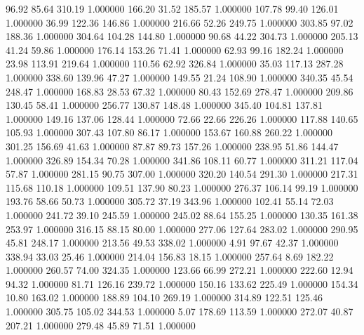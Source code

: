      96.92     85.64    310.19  1.000000
    166.20     31.52    185.57  1.000000
    107.78     99.40    126.01  1.000000
     36.99    122.36    146.86  1.000000
    216.66     52.26    249.75  1.000000
    303.85     97.02    188.36  1.000000
    304.64    104.28    144.80  1.000000
     90.68     44.22    304.73  1.000000
    205.13     41.24     59.86  1.000000
    176.14    153.26     71.41  1.000000
     62.93     99.16    182.24  1.000000
     23.98    113.91    219.64  1.000000
    110.56     62.92    326.84  1.000000
     35.03    117.13    287.28  1.000000
    338.60    139.96     47.27  1.000000
    149.55     21.24    108.90  1.000000
    340.35     45.54    248.47  1.000000
    168.83     28.53     67.32  1.000000
     80.43    152.69    278.47  1.000000
    209.86    130.45     58.41  1.000000
    256.77    130.87    148.48  1.000000
    345.40    104.81    137.81  1.000000
    149.16    137.06    128.44  1.000000
     72.66     22.66    226.26  1.000000
    117.88    140.65    105.93  1.000000
    307.43    107.80     86.17  1.000000
    153.67    160.88    260.22  1.000000
    301.25    156.69     41.63  1.000000
     87.87     89.73    157.26  1.000000
    238.95     51.86    144.47  1.000000
    326.89    154.34     70.28  1.000000
    341.86    108.11     60.77  1.000000
    311.21    117.04     57.87  1.000000
    281.15     90.75    307.00  1.000000
    320.20    140.54    291.30  1.000000
    217.31    115.68    110.18  1.000000
    109.51    137.90     80.23  1.000000
    276.37    106.14     99.19  1.000000
    193.76     58.66     50.73  1.000000
    305.72     37.19    343.96  1.000000
    102.41     55.14     72.03  1.000000
    241.72     39.10    245.59  1.000000
    245.02     88.64    155.25  1.000000
    130.35    161.38    253.97  1.000000
    316.15     88.15     80.00  1.000000
    277.06    127.64    283.02  1.000000
    290.95     45.81    248.17  1.000000
    213.56     49.53    338.02  1.000000
      4.91     97.67     42.37  1.000000
    338.94     33.03     25.46  1.000000
    214.04    156.83     18.15  1.000000
    257.64      8.69    182.22  1.000000
    260.57     74.00    324.35  1.000000
    123.66     66.99    272.21  1.000000
    222.60     12.94     94.32  1.000000
     81.71    126.16    239.72  1.000000
    150.16    133.62    225.49  1.000000
    154.34     10.80    163.02  1.000000
    188.89    104.10    269.19  1.000000
    314.89    122.51    125.46  1.000000
    305.75    105.02    344.53  1.000000
      5.07    178.69    113.59  1.000000
    272.07     40.87    207.21  1.000000
    279.48     45.89     71.51  1.000000
